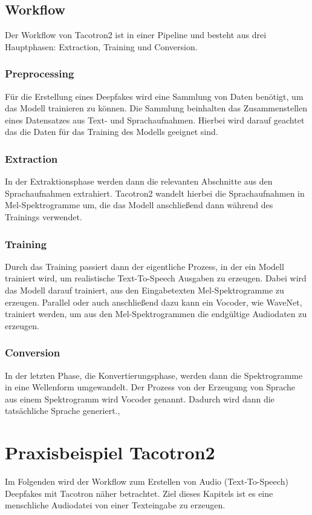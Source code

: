 \subsection{Workflow}
Der Workflow von Tacotron2 ist in einer Pipeline und besteht aus drei Hauptphasen: Extraction, Training und Conversion.
\subsubsection*{Preprocessing}
Für die Erstellung eines Deepfakes wird eine Sammlung von Daten benötigt, um das Modell trainieren zu können. Die Sammlung beinhalten das Zusammenstellen eines Datensatzes aus Text- und Sprachaufnahmen. Hierbei wird darauf geachtet das die Daten für das Training des Modells geeignet sind.\cite{Arxiv}
\subsubsection*{Extraction}
In der Extraktionsphase werden dann die relevanten Abschnitte aus den Sprachaufnahmen extrahiert. Tacotron2 wandelt hierbei die Sprachaufnahmen in Mel-Spektrogramme um, die das Modell anschließend dann während des Trainings verwendet.\cite{Arxiv}
\subsubsection*{Training}
Durch das Training passiert dann der eigentliche Prozess, in der ein Modell trainiert wird, um realistische Text-To-Speech Ausgaben zu erzeugen. Dabei wird das Modell darauf trainiert, aus den Eingabetexten Mel-Spektrogramme zu erzeugen. Parallel oder auch anschließend dazu kann ein Vocoder, wie WaveNet, trainiert werden, um aus den Mel-Spektrogrammen die endgültige Audiodaten zu erzeugen.\cite{Arxiv}
\subsubsection*{Conversion}
In der letzten Phase, die Konvertierungsphase, werden dann die Spektrogramme in eine Wellenform umgewandelt. Der Prozess von der Erzeugung von Sprache aus einem Spektrogramm wird Vocoder genannt. Dadurch wird dann die tatsächliche Sprache generiert.\cite{Arxiv},\cite{pytorch}
\section{Praxisbeispiel Tacotron2}
Im Folgenden wird der Workflow zum Erstellen von Audio (Text-To-Speech) Deepfakes mit Tacotron näher betrachtet. Ziel dieses Kapitels ist es eine menschliche Audiodatei von einer Texteingabe zu erzeugen.
